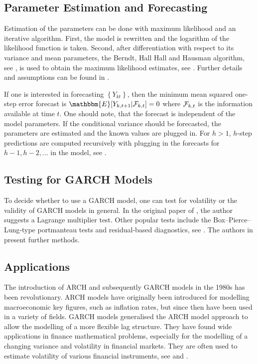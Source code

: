 \subsection{Parameter Estimation and Forecasting}
\label{sec: GARCH Parameter Estimation and Forecasting}

Estimation of the parameters can be done with maximum likelihood and an iterative algorithm. First, the model is rewritten and the logarithm of the likelihood function is taken. Second, after differentiation with respect to its variance and mean parameters, the Berndt, Hall Hall and Hausman algorithm, see \textcite{Berndt:1974}, is used to obtain the maximum likelihood estimates, see \textcite{Bollerslev:1986}. Further details and assumptions can be found in \textcite{Bollerslev:1986}. 

If one is interested in forecasting $\left\{Y_{kt}\right\}$, then the minimum mean squared one-step error forecast is $\mathbbm{E}[Y_{k,t+1}|\SigA_{k,t}]=0$ where $\mathcal{F}_{k,t}$ is the information available at time $t$. One should note, that the forecast is independent of the model parameters. If the conditional variance should be forecasted, the parameters are estimated and the known values are plugged in. For $h>1$, $h$-step predictions are computed recursively with plugging in the forecasts for $h-1,h-2,\ldots$ in the model, see \textcite{Zivot:2009}. 


\subsection{Testing for GARCH Models}
\label{sec: Testing for GARCH models}

To decide whether to use a GARCH model, one can test for volatility or the validity of GARCH models in general. In the original paper of \textcite{Bollerslev:1986}, the author suggests a Lagrange multiplier test. Other popular tests include the Box–Pierce–Lung‐type portmanteau tests and residual‐based diagnostics, see \textcite{Hong:2017}. The authors in \textcite{Hong:2017} present further methods. 


\subsection{Applications}
\label{sec: Garch Applications}

The introduction of ARCH and subsequently GARCH models in the 1980s has been revolutionary. ARCH models have originally been introduced for modelling macroeconomic key figures, such as inflation rates, but since then have been used in a variety of fields. GARCH models generalised the ARCH model approach to allow the modelling of a more flexible lag structure. They have found wide applications in finance mathematical problems, especially for the modelling of a changing variance and volatility in financial markets. They are often used to estimate volatility of various financial instruments, see \textcite{Bollerslev:1986} and \textcite{Kreiss:2006}. 

